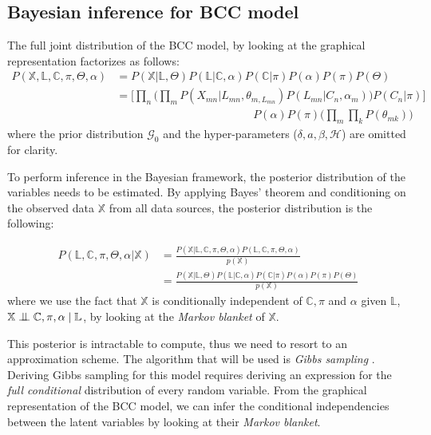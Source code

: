 \subsection{Bayesian inference for BCC model}\label{integr-bayes-inference-subsect}
The full joint distribution of the BCC model, by looking at the graphical representation factorizes as follows:
\begin{equation}%
  \begin{aligned}
	P(\mathbb{X}, \mathbb{L}, \mathbb{C}, \pi , \Theta , \alpha) & = P(\mathbb{X}|\mathbb{L},\Theta) P(\mathbb{L}|\mathbb{C},\alpha) P(\mathbb{C}|\pi) P(\alpha) P(\pi) P(\Theta) \\
	  & = \bigg[\prod_{n}\bigg(\prod_{m} P(X_{mn}|L_{mn},\theta_{m,L_{mn}}) P(L_{mn}|C_{n},\alpha_{m})\bigg) P(C_{n}|\pi)\bigg] \\
	  & \; \quad \quad \quad \quad \quad \quad \quad \quad \quad \quad \quad \quad P(\alpha) P(\pi) \bigg(\prod_{m}\prod_{k} P(\theta_{mk})\bigg)
  \end{aligned}
\end{equation}
where the prior distribution $\mathcal{G}_{0}$ and the hyper-parameters ($\delta, \mathit{a}, \beta, \mathcal{H}$) are omitted for clarity.

To perform inference in the Bayesian framework, the posterior distribution of the variables needs to be estimated. By applying Bayes' theorem and conditioning on the observed data $\mathbb{X}$ from all data sources, the posterior distribution is the following:

\begin{equation}%
	\begin{aligned}
	P(\mathbb{L},\mathbb{C},\pi,\Theta,\alpha | \mathbb{X}) & = \frac{P(\mathbb{X}|\mathbb{L},\mathbb{C},\pi,\Theta,\alpha) P(\mathbb{L},\mathbb{C},\pi,\Theta,\alpha)}{p(\mathbb{X})} \\
	& = \frac{P(\mathbb{X}|\mathbb{L},\Theta) P(\mathbb{L}|\mathbb{C},\alpha) P(\mathbb{C}|\pi) P(\alpha) P(\pi) P(\Theta)}{p(\mathbb{X})}
	\end{aligned}
\end{equation}
where we use the fact that $\mathbb{X}$ is conditionally independent of $\mathbb{C}, \pi$ and $\alpha$ given $\mathbb{L}$, \ie $\mathbb{X} \bigCI \mathbb{C}, \pi, \alpha \mid \mathbb{L}$, by looking at the \emph{Markov blanket} of $\mathbb{X}$. 

This posterior is intractable to compute, thus we need to resort to an approximation scheme. The algorithm that will be used is \emph{Gibbs sampling} \citep{Geman1984}. Deriving Gibbs sampling for this model requires deriving an expression for the \emph{full conditional} distribution of every random variable. From the graphical representation of the BCC model, we can infer the conditional independencies between the latent variables by looking at their \emph{Markov blanket}. 

